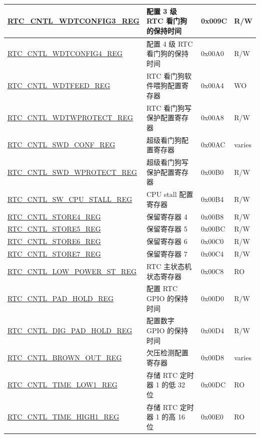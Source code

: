 \begin{longtable}{ | l | l | p{1.3cm} | p{1cm} | }
\hyperref[regdesc:RTCCNTLWDTCONFIG3REG]{RTC\_CNTL\_WDTCONFIG3\_REG} & 配置 3 级 RTC 看门狗的保持时间 & 0x009C & R/W \\ \hline
\hyperref[regdesc:RTCCNTLWDTCONFIG4REG]{RTC\_CNTL\_WDTCONFIG4\_REG} & 配置 4 级 RTC 看门狗的保持时间 & 0x00A0 & R/W \\ \hline
\hyperref[regdesc:RTCCNTLWDTFEEDREG]{RTC\_CNTL\_WDTFEED\_REG} & RTC 看门狗软件喂狗配置寄存器 & 0x00A4 & WO \\ \hline
\hyperref[regdesc:RTCCNTLWDTWPROTECTREG]{RTC\_CNTL\_WDTWPROTECT\_REG} & RTC 看门狗写保护配置寄存器 & 0x00A8 & R/W \\ \hline
\hyperref[regdesc:RTCCNTLSWDCONFREG]{RTC\_CNTL\_SWD\_CONF\_REG} & 超级看门狗配置寄存器 & 0x00AC & varies \\ \hline
\hyperref[regdesc:RTCCNTLSWDWPROTECTREG]{RTC\_CNTL\_SWD\_WPROTECT\_REG} & 超级看门狗写保护配置寄存器 & 0x00B0 & R/W \\ \hline
\hyperref[regdesc:RTCCNTLSWCPUSTALLREG]{RTC\_CNTL\_SW\_CPU\_STALL\_REG} & CPU stall 配置寄存器 & 0x00B4 & R/W \\ \hline
\hyperref[regdesc:RTCCNTLSTORE4REG]{RTC\_CNTL\_STORE4\_REG} & 保留寄存器 4 & 0x00B8 & R/W \\ \hline
\hyperref[regdesc:RTCCNTLSTORE5REG]{RTC\_CNTL\_STORE5\_REG} & 保留寄存器 5 & 0x00BC & R/W \\ \hline
\hyperref[regdesc:RTCCNTLSTORE6REG]{RTC\_CNTL\_STORE6\_REG} & 保留寄存器 6 & 0x00C0 & R/W \\ \hline
\hyperref[regdesc:RTCCNTLSTORE7REG]{RTC\_CNTL\_STORE7\_REG} & 保留寄存器 7 & 0x00C4 & R/W \\ \hline
\hyperref[regdesc:RTCCNTLLOWPOWERSTREG]{RTC\_CNTL\_LOW\_POWER\_ST\_REG} & RTC 主状态机状态寄存器 & 0x00C8 & RO \\ \hline
\hyperref[regdesc:RTCCNTLPADHOLDREG]{RTC\_CNTL\_PAD\_HOLD\_REG} & 配置 RTC GPIO 的保持时间 & 0x00D0 & R/W \\ \hline
\hyperref[regdesc:RTCCNTLDIGPADHOLDREG]{RTC\_CNTL\_DIG\_PAD\_HOLD\_REG} & 配置数字 GPIO 的保持时间 & 0x00D4 & R/W \\ \hline
\hyperref[regdesc:RTCCNTLBROWNOUTREG]{RTC\_CNTL\_BROWN\_OUT\_REG} & 欠压检测配置寄存器 & 0x00D8 & varies \\ \hline
\hyperref[regdesc:RTCCNTLTIMELOW1REG]{RTC\_CNTL\_TIME\_LOW1\_REG} & 存储 RTC 定时器 1 的低 32 位 & 0x00DC & RO \\ \hline
\hyperref[regdesc:RTCCNTLTIMEHIGH1REG]{RTC\_CNTL\_TIME\_HIGH1\_REG} & 存储 RTC 定时器 1 的高 16 位 & 0x00E0 & RO \\ \hline

\end{longtable}
